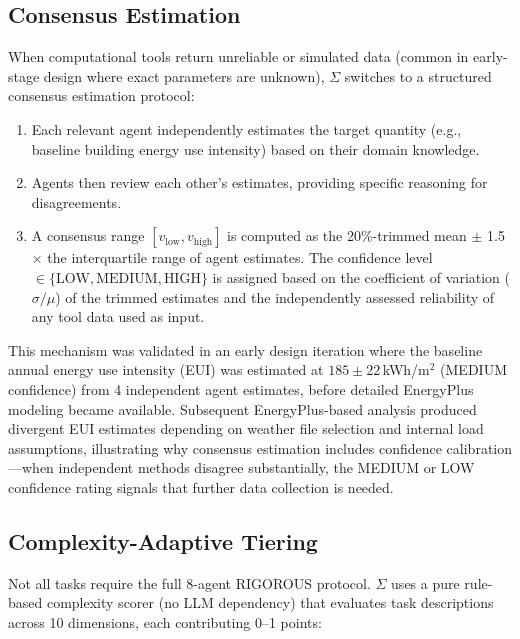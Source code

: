 \documentclass[11pt,a4paper]{article}
\begin{document}
\subsection{Consensus Estimation}

When computational tools return unreliable or simulated data (common in early-stage design where exact parameters are unknown), $\Sigma$ switches to a structured consensus estimation protocol:

\begin{enumerate}
    \item Each relevant agent independently estimates the target quantity (e.g., baseline building energy use intensity) based on their domain knowledge.
    \item Agents then review each other's estimates, providing specific reasoning for disagreements.
    \item A consensus range $[v_{\text{low}}, v_{\text{high}}]$ is computed as the 20\%-trimmed mean $\pm$ 1.5$\times$ the interquartile range of agent estimates. The confidence level $\in \{\text{LOW}, \text{MEDIUM}, \text{HIGH}\}$ is assigned based on the coefficient of variation ($\sigma / \mu$) of the trimmed estimates and the independently assessed reliability of any tool data used as input.
\end{enumerate}

This mechanism was validated in an early design iteration where the baseline annual energy use intensity (EUI) was estimated at $185 \pm 22$\,kWh/m$^2$ (MEDIUM confidence) from 4 independent agent estimates, before detailed EnergyPlus modeling became available. Subsequent EnergyPlus-based analysis produced divergent EUI estimates depending on weather file selection and internal load assumptions, illustrating why consensus estimation includes confidence calibration---when independent methods disagree substantially, the MEDIUM or LOW confidence rating signals that further data collection is needed.

\subsection{Complexity-Adaptive Tiering}

Not all tasks require the full 8-agent RIGOROUS protocol. $\Sigma$ uses a pure rule-based complexity scorer (no LLM dependency) that evaluates task descriptions across 10 dimensions, each contributing 0--1 points:
\end{document}
